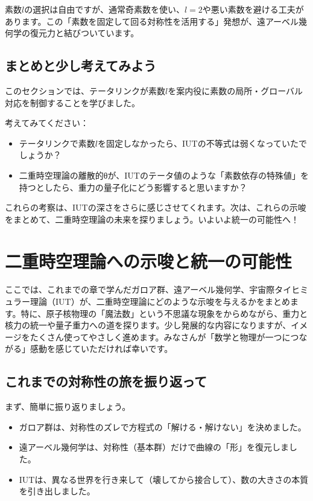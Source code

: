 \documentclass[dvipdfmx,12pt,a4paper]{jsarticle}
\begin{document}
素数$l$の選択は自由ですが、通常奇素数を使い、$l=2$や悪い素数を避ける工夫があります。この「素数を固定して回る対称性を活用する」発想が、遠アーベル幾何学の復元力と結びついています。

\subsection{まとめと少し考えてみよう}

このセクションでは、テータリンクが素数$l$を案内役に素数の局所・グローバル対応を制御することを学びました。

考えてみてください：
\begin{itemize}
  \item テータリンクで素数$l$を固定しなかったら、IUTの不等式は弱くなっていたでしょうか？
  \item 二重時空理論の離散的θが、IUTのテータ値のような「素数依存の特殊値」を持つとしたら、重力の量子化にどう影響すると思いますか？
\end{itemize}

これらの考察は、IUTの深さをさらに感じさせてくれます。次は、これらの示唆をまとめて、二重時空理論の未来を探りましょう。いよいよ統一の可能性へ！

\section{二重時空理論への示唆と統一の可能性}

ここでは、これまでの章で学んだガロア群、遠アーベル幾何学、宇宙際タイヒミュラー理論（IUT）が、二重時空理論にどのような示唆を与えるかをまとめます。特に、原子核物理の「魔法数」という不思議な現象をからめながら、重力と核力の統一や量子重力への道を探ります。少し発展的な内容になりますが、イメージをたくさん使ってやさしく進めます。みなさんが「数学と物理が一つにつながる」感動を感じていただければ幸いです。

\subsection{これまでの対称性の旅を振り返って}

まず、簡単に振り返りましょう。
\begin{itemize}
  \item ガロア群は、対称性のズレで方程式の「解ける・解けない」を決めました。
  \item 遠アーベル幾何学は、対称性（基本群）だけで曲線の「形」を復元しました。
  \item IUTは、異なる世界を行き来して（壊してから接合して）、数の大きさの本質を引き出しました。
\end{itemize}
\end{document}

